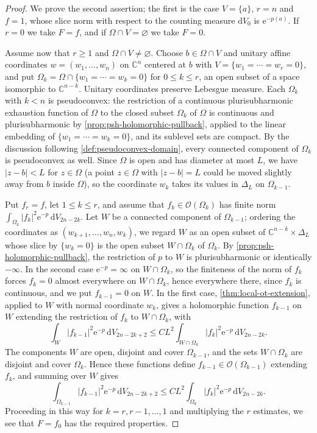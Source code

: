 \begin{proof}
We prove the second assertion; the first is the case $V=\{a\}$, $r=n$ and $f=1$, whose slice norm with respect to the counting measure $\mathrm dV_0$ is $\mathrm e^{-p(a)}$. If $r=0$ we take $F=f$, and if $\Omega\cap V=\varnothing$ we take $F=0$.

Assume now that $r\ge1$ and $\Omega\cap V\ne\varnothing$. Choose $b\in\Omega\cap V$ and unitary affine coordinates $w=(w_1,\ldots,w_n)$ on $\mathbb C^n$ centered at $b$ with $V=\{w_1=\cdots=w_r=0\}$, and put $\Omega_k=\Omega\cap\{w_1=\cdots=w_k=0\}$ for $0\le k\le r$, an open subset of a space isomorphic to $\mathbb C^{n-k}$. Unitary coordinates preserve Lebesgue measure. Each $\Omega_k$ with $k<n$ is pseudoconvex: the restriction of a continuous plurisubharmonic exhaustion function of $\Omega$ to the closed subset $\Omega_k$ of $\Omega$ is continuous and plurisubharmonic by \cref{prop:psh-holomorphic-pullback}, applied to the linear embedding of $\{w_1=\cdots=w_k=0\}$, and its sublevel sets are compact. By the discussion following \cref{def:pseudoconvex-domain}, every connected component of $\Omega_k$ is pseudoconvex as well. Since $\Omega$ is open and has diameter at most $L$, we have $|z-b|<L$ for $z\in\Omega$ (a point $z\in\Omega$ with $|z-b|=L$ could be moved slightly away from $b$ inside $\Omega$), so the coordinate $w_k$ takes its values in $\Delta_L$ on $\Omega_{k-1}$.

Put $f_r=f$, let $1\le k\le r$, and assume that $f_k\in\mathcal O(\Omega_k)$ has finite norm $\int_{\Omega_k}|f_k|^2\mathrm e^{-p}\,\mathrm dV_{2n-2k}$. Let $W$ be a connected component of $\Omega_{k-1}$; ordering the coordinates as $(w_{k+1},\ldots,w_n,w_k)$, we regard $W$ as an open subset of $\mathbb C^{n-k}\times\Delta_L$ whose slice by $\{w_k=0\}$ is the open subset $W\cap\Omega_k$ of $\Omega_k$. By \cref{prop:psh-holomorphic-pullback}, the restriction of $p$ to $W$ is plurisubharmonic or identically $-\infty$. In the second case $\mathrm e^{-p}=\infty$ on $W\cap\Omega_k$, so the finiteness of the norm of $f_k$ forces $f_k=0$ almost everywhere on $W\cap\Omega_k$, hence everywhere there, since $f_k$ is continuous, and we put $f_{k-1}=0$ on $W$. In the first case, \cref{thm:local-ot-extension}, applied to $W$ with normal coordinate $w_k$, gives a holomorphic function $f_{k-1}$ on $W$ extending the restriction of $f_k$ to $W\cap\Omega_k$, with
\[
 \int_W|f_{k-1}|^2\mathrm e^{-p}\,\mathrm dV_{2n-2k+2}\le CL^2\int_{W\cap\Omega_k}|f_k|^2\mathrm e^{-p}\,\mathrm dV_{2n-2k}.
\]
The components $W$ are open, disjoint and cover $\Omega_{k-1}$, and the sets $W\cap\Omega_k$ are disjoint and cover $\Omega_k$. Hence these functions define $f_{k-1}\in\mathcal O(\Omega_{k-1})$ extending $f_k$, and summing over $W$ gives
\[
 \int_{\Omega_{k-1}}|f_{k-1}|^2\mathrm e^{-p}\,\mathrm dV_{2n-2k+2}\le CL^2\int_{\Omega_k}|f_k|^2\mathrm e^{-p}\,\mathrm dV_{2n-2k}.
\]
Proceeding in this way for $k=r,r-1,\ldots,1$ and multiplying the $r$ estimates, we see that $F=f_0$ has the required properties.
\end{proof}

